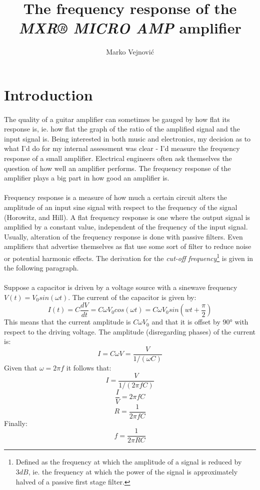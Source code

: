 \documentclass[a4paper, 12pt]{article}
\title{The frequency response of the \textit{MXR® MICRO AMP} amplifier}
\author{Marko Vejnovi\'{c}}
\begin{document}
\maketitle

\section{Introduction}
\paragraph*{}
The quality of a guitar amplifier can sometimes be gauged by how flat its 
response is, ie. how flat the graph of the ratio of the amplified signal and 
the input signal is. Being interested in both music and electronics, my 
decision as to what I'd do for my internal assessment was clear - I'd measure 
the frequency response of a small amplifier. Electrical engineers often ask 
themselves the question of how well an amplifier performs. The frequency 
response of the amplifier plays a big part in how good an amplifier is.

\paragraph*{}
Frequency response is a measure of how much a certain circuit alters the 
amplitude of an input sine signal with respect to the frequency of the signal 
(Horowitz, and Hill). A flat frequency response is one where the output signal 
is amplified by a constant value, independent of the frequency of the input 
signal. Usually, alteration of the frequency response is done with passive 
filters. Even amplifiers that advertise themselves as flat use some sort of 
filter to reduce noise or potential harmonic effects. The derivation for 
the \textit{cut-off frequency}\footnote{Defined as the frequency at which the 
amplitude of a signal is reduced by $3\si{dB}$, ie. the frequency at which the 
power of the signal is approximately halved of a passive first stage filter.} 
is given in the following paragraph.

\paragraph*{} 
Suppose a capacitor is driven by a voltage source with a sinewave frequency 
$V(t) = V_0 sin(\omega t)$. The current of the capacitor is given by:
$$I(t) = C \frac{dV}{dt} = C \omega V_0 cos (\omega t) = 
C \omega V_0 sin(wt + \frac{\pi}{2})$$
This means that the current amplitude is $C \omega V_0$ and that it is offset 
by $\ang{90}$ with respect to the driving voltage. The amplitude (disregarding 
phases) of the current is:
$$I = C \omega V = \frac{V}{1 / (\omega C)}$$
Given that $\omega = 2 \pi f$ it follows that:
$$I = \frac{V}{1 /(2 \pi f C)}$$
$$\frac{I}{V} = 2 \pi f C$$
$$R = \frac{1}{2 \pi f C}$$
Finally:
\begin{equation} 
	f = \frac{1}{2 \pi R C}
	\label{eqn:cutoff-freq}
\end{equation}
\end{document}
